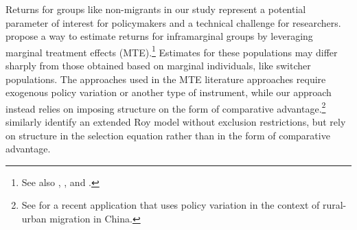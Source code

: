 Returns for groups like non-migrants in our study represent a potential parameter of interest for policymakers and a technical challenge for researchers. 
\cite{heckmanLocalInstrumentalVariables1999} propose a way to estimate returns for inframarginal groups by leveraging marginal treatment effects (MTE).\footnote{See also \cite{heckmanStructuralEquations2005}, \cite{heckmanComparingIVwithStructural2010}, and \cite{cornelissenFromLATEtoMTE2016}.}
Estimates for these populations may differ sharply from those obtained based on marginal individuals, like switcher populations.
The approaches used in the MTE literature approaches require exogenous policy variation or another type of instrument, while our approach instead relies on imposing structure on the form of comparative advantage.\footnote{See \cite{gaiRuralPensionsLabor2025} for a recent application that uses policy variation in the context of rural-urban migration in China.}
\cite{dhaultfoeuilleInferenceExtendedRoy2013} similarly identify an extended Roy model without exclusion restrictions, but rely on structure in the selection equation rather than in the form of comparative advantage.

